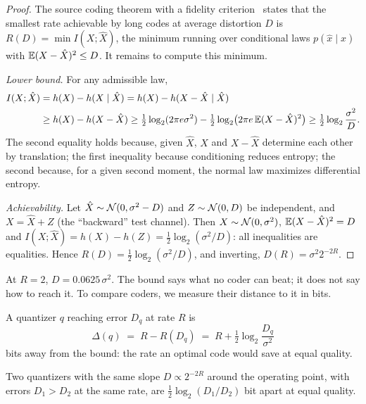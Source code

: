 \begin{proof}
The source coding theorem with a fidelity criterion~\cite{shannon1959} states that the smallest rate achievable by long codes at average distortion $D$ is $R(D) = \min I(X; \hat X)$, the minimum running over conditional laws $p(\hat x \mid x)$ with $\mathbb{E}(X - \hat X)^2 \le D$. It remains to compute this minimum.

\emph{Lower bound.} For any admissible law,
\begin{align*}
I(X; \hat X) &= h(X) - h(X \mid \hat X) = h(X) - h(X - \hat X \mid \hat X) \\
&\ge h(X) - h(X - \hat X) \ge \tfrac12 \log_2(2\pi e \sigma^2) - \tfrac12 \log_2\bigl(2\pi e\, \mathbb{E}(X-\hat X)^2\bigr) \ge \tfrac12 \log_2 \frac{\sigma^2}{D}.
\end{align*}
The second equality holds because, given $\hat X$, $X$ and $X - \hat X$ determine each other by translation; the first inequality because conditioning reduces entropy; the second because, for a given second moment, the normal law maximizes differential entropy.

\emph{Achievability.} Let $\hat X \sim \mathcal{N}(0, \sigma^2 - D)$ and $Z \sim \mathcal{N}(0, D)$ be independent, and $X = \hat X + Z$ (the \enquote{backward} test channel). Then $X \sim \mathcal{N}(0,\sigma^2)$, $\mathbb{E}(X - \hat X)^2 = D$ and $I(X;\hat X) = h(X) - h(Z) = \tfrac12\log_2(\sigma^2/D)$: all inequalities are equalities. Hence $R(D) = \tfrac12\log_2(\sigma^2/D)$, and inverting, $D(R) = \sigma^2 2^{-2R}$.
\end{proof}

At $R = 2$, $D = 0.0625\,\sigma^2$. The bound says what no coder can beat; it does not say how to reach it. To compare coders, we measure their distance to it in bits.

\begin{definition}\label{def:distance}
A quantizer $q$ reaching error $D_q$ at rate $R$ is
\[
\Delta(q) \;=\; R - R(D_q) \;=\; R + \tfrac12 \log_2 \frac{D_q}{\sigma^2}
\]
bits away from the bound: the rate an optimal code would save at equal quality.
\end{definition}

\begin{lemme}\label{lem:rapport-bits}
Two quantizers with the same slope $D \propto 2^{-2R}$ around the operating point, with errors $D_1 > D_2$ at the same rate, are $\tfrac12 \log_2(D_1/D_2)$ bit apart at equal quality.
\end{lemme}

